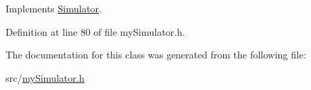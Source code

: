 Implements \mbox{\hyperlink{class_simulator_a78e300570318b9cd65f52b9547dee070}{Simulator}}.



Definition at line 80 of file my\+Simulator.\+h.


\begin{DoxyCode}{0}

\end{DoxyCode}


The documentation for this class was generated from the following file\+:\begin{DoxyCompactItemize}
\item 
src/\mbox{\hyperlink{my_simulator_8h}{my\+Simulator.\+h}}\end{DoxyCompactItemize}
